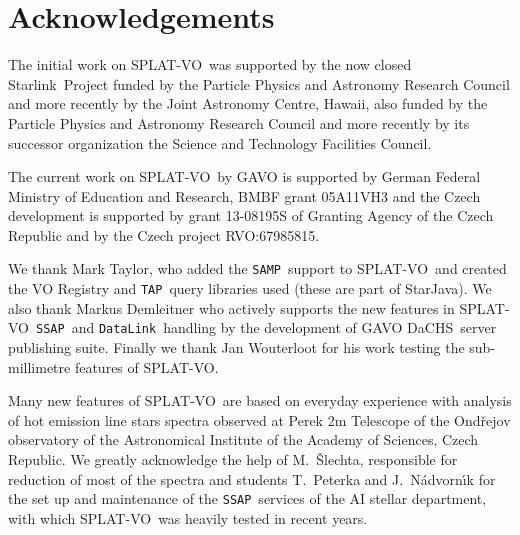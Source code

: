 \documentclass[final,authoryear,5p,times,twocolumn]{elsarticle}
\newcommand{\datalink}{\texttt{DataLink}}
\newcommand{\ssap}{\texttt{SSAP}}
\newcommand{\tap}{\texttt{TAP}}
\newcommand{\samp}{\texttt{SAMP}}
\newcommand{\splatvo}{{\textsf{\small{SPLAT-VO}}}}
\newcommand{\dachs}{\textsf{\small DaCHS}}
\newcommand{\Starlink}{\textsf{\small Starlink}}
\begin{document}
\section*{Acknowledgements}

The initial work on \splatvo\ was supported by the now closed \Starlink\
Project funded by the Particle Physics and Astronomy Research Council and more
recently by the Joint Astronomy Centre, Hawaii, also funded by the Particle
Physics and Astronomy Research Council and more recently by its successor
organization the Science and Technology Facilities Council.

The current work on \splatvo\ by GAVO is supported by German Federal Ministry
of Education and Research, BMBF grant 05A11VH3 and the Czech development is
supported by grant 13-08195S of Granting Agency of the Czech Republic and by
the Czech project RVO:67985815.

We thank Mark Taylor, who added the \samp\ support to \splatvo\ and created the
VO Registry and \tap\ query libraries used (these are part of StarJava).  We
also thank Markus Demleitner who actively supports the new features in
\splatvo\ \ssap\ and \datalink\ handling by the development of GAVO \dachs\
server publishing suite.  Finally we thank Jan Wouterloot for his work testing
the sub-millimetre features of \splatvo.

Many new features of \splatvo\ are based on everyday experience with analysis
of hot emission line stars spectra observed at Perek 2m Telescope of the
Ond\v{r}ejov observatory of the Astronomical Institute of the Academy of
Sciences, Czech Republic. We greatly acknowledge the help of M.~\v{S}lechta,
responsible for reduction of most of the spectra and students T.~Peterka and
J.~N\'advorn\'\i{}k for the set up and maintenance of the \ssap\ services of
the AI stellar department, with which \splatvo\ was heavily tested in recent
years.



\end{document}
